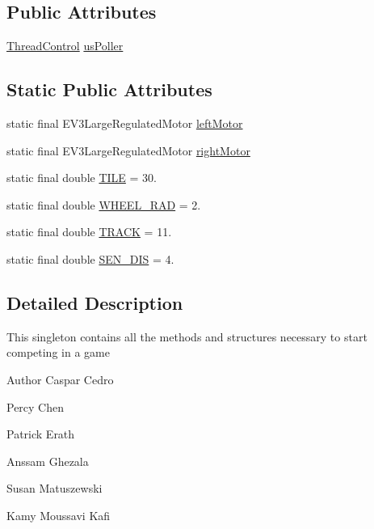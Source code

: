 \subsection*{Public Attributes}
\begin{DoxyCompactItemize}
\item 
\hyperlink{classca_1_1mcgill_1_1ecse211_1_1threads_1_1_thread_control}{Thread\+Control} \hyperlink{enumca_1_1mcgill_1_1ecse211_1_1project_1_1_game_af6fee74efff891793b32352caa110465}{us\+Poller}
\end{DoxyCompactItemize}
\subsection*{Static Public Attributes}
\begin{DoxyCompactItemize}
\item 
static final E\+V3\+Large\+Regulated\+Motor \hyperlink{enumca_1_1mcgill_1_1ecse211_1_1project_1_1_game_a7c673571bf50fdb6917a9d7bb671e003}{left\+Motor}
\item 
static final E\+V3\+Large\+Regulated\+Motor \hyperlink{enumca_1_1mcgill_1_1ecse211_1_1project_1_1_game_a7a05fcf37c4435c32270776a427ba0d2}{right\+Motor}
\item 
static final double \hyperlink{enumca_1_1mcgill_1_1ecse211_1_1project_1_1_game_a72c2224ad4dd557dde445ebc4baaf531}{T\+I\+LE} = 30.
\item 
static final double \hyperlink{enumca_1_1mcgill_1_1ecse211_1_1project_1_1_game_a91bd64670c2a91d006c907142783b1f8}{W\+H\+E\+E\+L\+\_\+\+R\+AD} = 2.
\item 
static final double \hyperlink{enumca_1_1mcgill_1_1ecse211_1_1project_1_1_game_a64cf12cdd6772ac1ce351ff1dfadd626}{T\+R\+A\+CK} = 11.
\item 
static final double \hyperlink{enumca_1_1mcgill_1_1ecse211_1_1project_1_1_game_ab940d1a52b9759294dc0229e0fd6bc06}{S\+E\+N\+\_\+\+D\+IS} = 4.
\end{DoxyCompactItemize}


\subsection{Detailed Description}
This singleton contains all the methods and structures necessary to start competing in a game

\begin{DoxyAuthor}{Author}
Caspar Cedro 

Percy Chen 

Patrick Erath 

Anssam Ghezala 

Susan Matuszewski 

Kamy Moussavi Kafi 
\end{DoxyAuthor}



